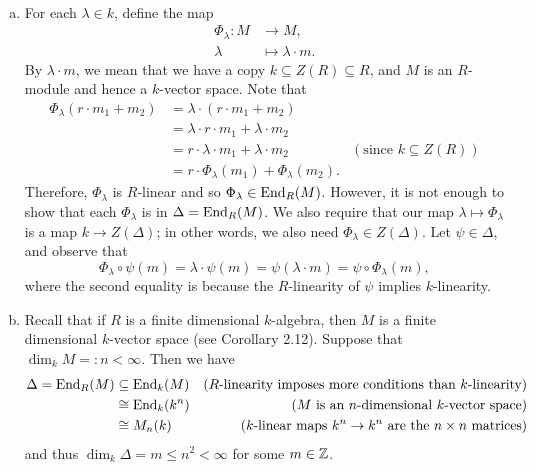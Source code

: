 \begin{pf}~
\begin{enumerate}[(a)]
    \item For each $\lambda \in k$, define the map 
    \begin{align*}
        \Phi_\lambda : M &\to M, \\ \lambda &\mapsto \lambda \cdot m. 
    \end{align*}
    By $\lambda \cdot m$, we mean that we have a copy $k \subseteq Z(R) \subseteq R$, and $M$ 
    is an $R$-module and hence a $k$-vector space. Note that 
    \begin{align*}
        \Phi_\lambda(r \cdot m_1 + m_2) &= \lambda \cdot (r \cdot m_1 + m_2) \\
        &= \lambda \cdot r \cdot m_1 + \lambda \cdot m_2 \\
        &= r \cdot \lambda \cdot m_1 + \lambda \cdot m_2 & (\text{since $k \subseteq Z(R)$}) \\
        &= r \cdot \Phi_\lambda(m_1) + \Phi_\lambda(m_2).
    \end{align*}
    Therefore, $\Phi_\lambda$ is $R$-linear and so $\Phi_\lambda \in \operatorname{End}_R(M)$. However, it is not 
    enough to show that each $\Phi_\lambda$ is in $\Delta = \operatorname{End}_R(M)$. We also require that our map 
    $\lambda \mapsto \Phi_\lambda$ is a map $k \to Z(\Delta)$; in other words, we also need 
    $\Phi_\lambda \in Z(\Delta)$. Let $\psi \in \Delta$, and observe that 
    \[ \Phi_\lambda \circ \psi(m) = \lambda \cdot \psi(m) = \psi(\lambda \cdot m) = \psi \circ 
    \Phi_\lambda(m), \]
    where the second equality is because the $R$-linearity of $\psi$ implies $k$-linearity.
    
    \item Recall that if $R$ is a finite dimensional $k$-algebra, then $M$ is a finite dimensional 
    $k$-vector space (see Corollary 2.12). Suppose that $\dim_k M =: n < \infty$. Then we have 
    \begin{align*}
        \Delta = \operatorname{End}_R(M) &\subseteq \operatorname{End}_k(M) & (\text{$R$-linearity imposes more conditions than 
        $k$-linearity}) \\
        &\cong\operatorname{End}_k(k^n) & (\text{$M$ is an $n$-dimensional $k$-vector space}) \\
        &\cong M_n(k) & (\text{$k$-linear maps $k^n \to k^n$ are the $n \times n$ matrices})
    \end{align*}
    and thus $\dim_k \Delta = m \leq n^2 < \infty$ for some $m \in \mathbb{Z}$. 
    

\end{enumerate}
\end{pf}
